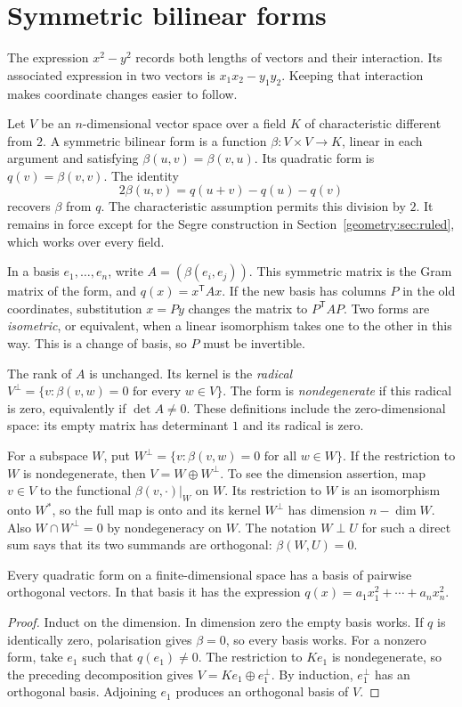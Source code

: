 \section{Symmetric bilinear forms}

The expression $x^2-y^2$ records both lengths of vectors and their
interaction. Its associated expression in two vectors is
$x_1x_2-y_1y_2$. Keeping that interaction makes coordinate changes easier
to follow.

Let $V$ be an $n$-dimensional vector space over a field $K$ of
characteristic different from $2$. A symmetric bilinear form is a function
$\beta:V\times V\to K$, linear in each argument and satisfying
$\beta(u,v)=\beta(v,u)$. Its quadratic form is $q(v)=\beta(v,v)$.
The identity
\[
 2\beta(u,v)=q(u+v)-q(u)-q(v)
\]
recovers $\beta$ from $q$. The characteristic assumption permits this
division by $2$. It remains in force except for the Segre construction
in Section~\ref{geometry:sec:ruled}, which works over every field.

In a basis $e_1,\ldots,e_n$, write $A=(\beta(e_i,e_j))$.
This symmetric matrix is the Gram matrix of the form, and $q(x)=x^{\mathsf T}Ax$.
If the new basis has columns $P$ in the old coordinates, substitution
$x=Py$ changes the matrix to $P^{\mathsf T}AP$. Two forms are
\emph{isometric}, or equivalent, when a linear isomorphism takes one to
the other in this way. This is a change of basis, so $P$ must be invertible.

The rank of $A$ is unchanged. Its kernel is the \emph{radical}
$V^\perp=\{v:\beta(v,w)=0\text{ for every }w\in V\}$.
The form is \emph{nondegenerate} if this radical is zero, equivalently
if $\det A\ne0$. These definitions include the zero-dimensional space:
its empty matrix has determinant $1$ and its radical is zero.

For a subspace $W$, put
$W^\perp=\{v:\beta(v,w)=0\text{ for all }w\in W\}$.
If the restriction to $W$ is nondegenerate, then
$V=W\oplus W^\perp$. To see the dimension assertion, map
$v\in V$ to the functional $\beta(v,\cdot)|_W$ on $W$.
Its restriction to $W$ is an isomorphism onto $W^*$, so the full map
is onto and its kernel $W^\perp$ has dimension $n-\dim W$.
Also $W\cap W^\perp=0$ by nondegeneracy on $W$.
The notation $W\perp U$ for such a direct sum says that its two summands
are orthogonal: $\beta(W,U)=0$.

\begin{proposition}\label{geometry:prop:orthbasis}
Every quadratic form on a finite-dimensional space has a basis of
pairwise orthogonal vectors. In that basis it has the expression
$q(x)=a_1x_1^2+\cdots+a_nx_n^2$.
\end{proposition}
\begin{proof}
Induct on the dimension. In dimension zero the empty basis works.
If $q$ is identically zero, polarisation gives $\beta=0$, so every basis
works. For a nonzero form, take $e_1$ such that $q(e_1)\ne0$.
The restriction to $Ke_1$ is nondegenerate, so the preceding decomposition
gives $V=Ke_1\oplus e_1^\perp$.
By induction, $e_1^\perp$ has an orthogonal basis. Adjoining $e_1$
produces an orthogonal basis of $V$.
\end{proof}

